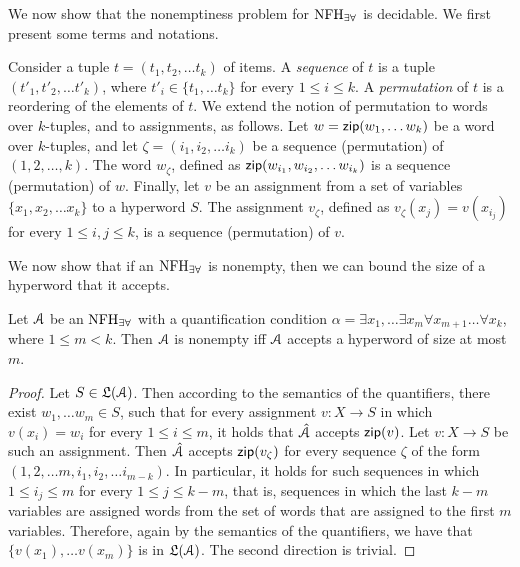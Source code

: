 We now show that the nonemptiness problem for $\textrm{NFH}_{\exists\forall}$ is decidable. We first 
present some terms and notations.  

Consider a tuple $t = (t_1,t_2,\ldots t_k)$ of items. 
A {\em sequence} of $t$ is a tuple $(t'_1, t'_2,\ldots t'_k)$, where 
$t'_i\in\{t_1,\ldots t_k\}$ for every $1\leq i \leq k$. 
A {\em permutation} of $t$ is a reordering of the elements of $t$. 
We extend the notion of permutation to words over $k$-tuples, and to 
assignments, as follows. 
Let $w = \mathsf{zip}(w_1,\ldots w_k)$ be a word over $k$-tuples, and let $\zeta = 
(i_1,i_2,\ldots i_k)$ be a sequence (permutation) of $(1,2,\ldots, k)$. The word $w_\zeta$, 
defined as $\mathsf{zip}(w_{i_1}, w_{i_2}, \ldots w_{i_k})$ is a sequence (permutation) of $w$.
Finally, let $v$ be an assignment from a set of variables $\{x_1,x_2,\ldots 
x_k\}$ to a hyperword $S$. The assignment $v_\zeta$, defined as $v_\zeta(x_j) = 
v(x_{i_j})$ for every $1\leq i,j \leq k$, is a sequence (permutation) of $v$. 

We now show that if an $\textrm{NFH}_{\exists\forall}$ is nonempty, then we can bound the size of a 
hyperword that it accepts.

\begin{lemma}\label{lemma:nfhef.nonempty}
Let $\mathcal{A}$ be an $\textrm{NFH}_{\exists\forall}$ with a quantification condition $\alpha = \exists x_1,\ldots \exists x_m \forall 
x_{m+1}\ldots \forall x_k$, where $1 \leq m < k$. 
Then $\mathcal{A}$ is nonempty iff $\mathcal{A}$ accepts a hyperword of size at most $m$.
\end{lemma}

\begin{proof}
Let $S\in\mathfrak{L}(\mathcal{A})$. Then according to the semantics of the quantifiers, there 
exist $w_1,\ldots w_m \in S$, such that for every 
assignment $v:X\rightarrow S$ in which $v(x_i) = w_i$ for every $1\leq i\leq m$, 
it holds that $\hat{\mathcal{A}}$ accepts $\mathsf{zip}(v)$.
Let $v:X\rightarrow S$ be such an assignment.
Then $\hat{\mathcal{A}}$ accepts 
$\mathsf{zip}(v_\zeta)$ for every sequence $\zeta$ of the form $(1,2,\ldots m,i_1,i_2,\ldots 
i_{m-k})$. 
In particular, it holds for such sequences in which 
$1\leq i_j\leq m$ for every $1\leq j \leq k-m$,
that is, sequences in which the last $k-m$ variables are assigned words from 
the set of words that are assigned to the first $m$ variables. Therefore, again 
by the semantics of the quantifiers, we have that $\{v(x_1),\ldots v(x_m)\}$ is 
in $\mathfrak{L}(\mathcal{A})$.
The second direction is trivial.
\end{proof}

